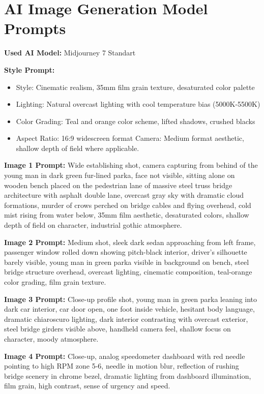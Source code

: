 \appendix

\chapter{AI Image Generation Model Prompts}
    \textbf{Used AI Model:} Midjourney 7 Standart
    
    \textbf{Style Prompt:}
    \begin{itemize}
        \item Style: Cinematic realism, 35mm film grain texture, desaturated color palette 
        \item Lighting: Natural overcast lighting with cool temperature bias (5000K-5500K) 
        \item Color Grading: Teal and orange color scheme, lifted shadows, crushed blacks 
        \item Aspect Ratio: 16:9 widescreen format Camera: Medium format aesthetic, shallow depth of field where applicable.
    \end{itemize}

    \textbf{Image 1 Prompt:} Wide establishing shot, camera capturing from behind of the young man in dark green fur-lined parka, face not visible, sitting alone on wooden bench placed on the pedestrian lane of massive steel truss bridge architecture with asphalt double lane, overcast gray sky with dramatic cloud formations, murder of crows perched on bridge cables and flying overhead, cold mist rising from water below, 35mm film aesthetic, desaturated colors, shallow depth of field on character, industrial gothic atmosphere.

    \textbf{Image 2 Prompt:} Medium shot, sleek dark sedan approaching from left frame, passenger window rolled down showing pitch-black interior, driver's silhouette barely visible, young man in green parka visible in background on bench, steel bridge structure overhead, overcast lighting, cinematic composition, teal-orange color grading, film grain texture.

    \textbf{Image 3 Prompt:} Close-up profile shot, young man in green parka leaning into dark car interior, car door open, one foot inside vehicle, hesitant body language, dramatic chiaroscuro lighting, dark interior contrasting with overcast exterior, steel bridge girders visible above, handheld camera feel, shallow focus on character, moody atmosphere.

    \textbf{Image 4 Prompt:} Close-up, analog speedometer dashboard with red needle pointing to high RPM zone 5-6, needle in motion blur, reflection of rushing bridge scenery in chrome bezel, dramatic lighting from dashboard illumination, film grain, high contrast, sense of urgency and speed.

